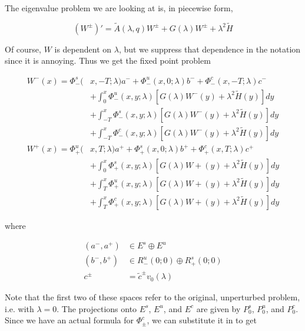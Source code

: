 \documentclass[12pt]{article}
\begin{document}
The eigenvalue problem we are looking at is, in piecewise form,

\[
(W^\pm)' = \tilde{A}(\lambda, q) W^\pm + G(\lambda)W^\pm + \lambda^2 \tilde{H}
\]

Of course, $W$ is dependent on $\lambda$, but we suppress that dependence in the notation since it is annoying. Thus we get the fixed point problem

\begin{align*}
W^-(x) = \Phi^s_-(&x, -T; \lambda)a^- + \Phi^u_-(x, 0; \lambda)b^- + \Phi^c_-(x, -T; \lambda)c^- \\
&+ \int_0^x \Phi^u_-(x, y; \lambda)[ G(\lambda)W^-(y) + \lambda^2 \tilde{H}(y) ] dy \\
&+ \int_{-T}^x \Phi^s_-(x, y; \lambda) [ G(\lambda)W^-(y) + \lambda^2 \tilde{H}(y) ] dy \\
&+ \int_{-T}^x \Phi^c_-(x, y; \lambda) [ G(\lambda)W^-(y) + \lambda^2 \tilde{H}(y) ]dy \\
W^+(x) = \Phi^u_+(&x, T; \lambda)a^+ + \Phi^s_+(x, 0; \lambda)b^+ + \Phi^c_+(x, T; \lambda)c^+ \\
&+ \int_0^x \Phi^s_+(x, y; \lambda) [ G(\lambda)W+(y) + \lambda^2 \tilde{H}(y) ] dy \\
&+ \int_T^x \Phi^u_+(x, y; \lambda) [ G(\lambda)W+(y) + \lambda^2 \tilde{H}(y) ] dy \\
&+ \int_T^x \Phi^c_+(x, y; \lambda) [ G(\lambda)W+(y) + \lambda^2 \tilde{H}(y) ] dy
\end{align*}

where

\begin{align*}
(a^-, a^+) &\in E^s \oplus E^u\\
(b^-, b^+) &\in R^u_-(0; 0) \oplus R^s_+(0; 0)\\
c^\pm &= \tilde{c}^\pm v_0(\lambda)
\end{align*}

Note that the first two of these spaces refer to the original, unperturbed problem, i.e. with $\lambda = 0$. The projections onto $E^s$, $E^u$, and $E^c$ are given by $P_0^s$, $P_0^u$, and $P_0^c$.\\

Since we have an actual formula for $\Phi^c_\pm$, we can substitute it in to get
\end{document}
